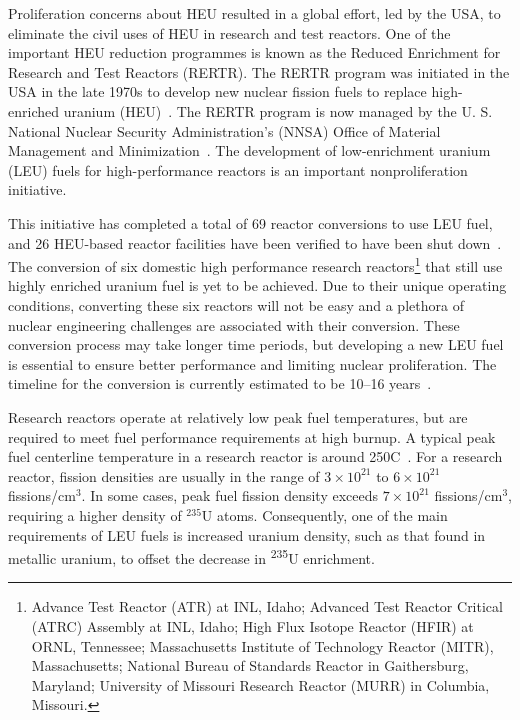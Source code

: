 Proliferation concerns about HEU resulted in a global effort, led by the USA, to eliminate the civil uses of HEU in research and test reactors. One of the important HEU reduction programmes is known as the Reduced Enrichment for Research and Test Reactors (RERTR). The RERTR program was initiated in the USA in the late 1970s to develop new nuclear fission fuels to replace high-enriched uranium (HEU)~\cite{travelli1980current,snelgrove1997development}\@.  The RERTR program is now managed by the U. S. National Nuclear Security Administration's (NNSA) Office of Material Management and Minimization~\cite{burkes2021thermal}. The development of low-enrichment uranium (LEU) fuels for high-performance reactors is an important nonproliferation initiative.

This initiative has completed a total of 69 reactor conversions to use LEU fuel, and 26 HEU-based reactor facilities have been verified to have been shut down~\cite{wilson2017us}. The conversion of six domestic high performance research reactors\footnote{Advance Test Reactor (ATR) at INL, Idaho; Advanced Test Reactor Critical (ATRC) Assembly at INL, Idaho; High Flux Isotope Reactor (HFIR) at ORNL, Tennessee; Massachusetts Institute of Technology Reactor (MITR), Massachusetts; National Bureau of Standards Reactor in Gaithersburg, Maryland; University of Missouri Research Reactor (MURR) in Columbia, Missouri.} that still use highly enriched uranium fuel is yet to be achieved. Due to their unique operating conditions, converting these six reactors will not be easy and a plethora of nuclear engineering challenges are associated with their conversion. These conversion process may take longer time periods, but developing a new LEU fuel is essential to ensure better performance and limiting nuclear proliferation. The timeline for the conversion is currently estimated to be 10--16 years~\cite{national2016reducing, national2012progress, kaufmann1962nuclear}. 


Research reactors operate at relatively low peak fuel temperatures, but are required to meet fuel performance requirements at high burnup. A typical peak fuel centerline temperature in a research reactor is around 250\textdegree C~\cite{meyer2014irradiation}. For a research reactor, fission densities are usually in the range of $3\times10^{21}$ to $6\times10^{21}$ fissions/cm$^3$. In some cases, peak fuel fission density exceeds $7\times10^{21}$ fissions/cm$^3$, requiring a higher density of $^{235}$U atoms. Consequently, one of the main requirements of LEU fuels is increased uranium density, such as that found in metallic uranium, to offset the decrease in \textsuperscript{235}U enrichment. 

